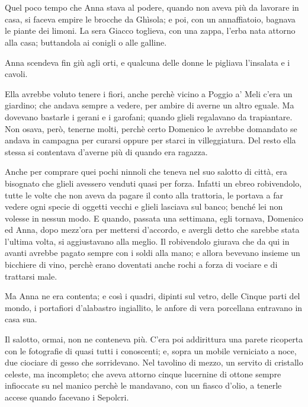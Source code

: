 \chapter{}

Quel poco tempo che Anna stava al podere, quando non aveva più da lavorare in casa, si faceva empire le brocche da Ghìsola; e poi, con un annaffiatoio, bagnava le piante dei limoni. La sera Giacco toglieva, con una zappa, l'erba nata attorno alla casa; buttandola ai conigli o alle galline.

Anna scendeva fin giù agli orti, e qualcuna delle donne le pigliava l'insalata e i cavoli.

Ella avrebbe voluto tenere i fiori, anche perchè vicino a Poggio a' Meli c'era un giardino; che andava sempre a vedere, per ambire di averne un altro eguale. Ma dovevano bastarle i gerani e i garofani; quando glieli regalavano da trapiantare. Non osava, però, tenerne molti, perchè certo Domenico le avrebbe domandato se andava in campagna per curarsi oppure per starci in villeggiatura. Del resto ella stessa si contentava d'averne più di quando era ragazza.

Anche per comprare quei pochi ninnoli che teneva nel suo salotto di città, era bisognato che glieli avessero venduti quasi per forza. Infatti un ebreo robivendolo, tutte le volte che non aveva da pagare il conto alla trattoria, le portava a far vedere ogni specie di oggetti vecchi e glieli lasciava sul banco; benché lei non volesse in nessun modo. E quando, passata una settimana, egli tornava, Domenico ed Anna, dopo mezz'ora per mettersi d'accordo, e avergli detto che sarebbe stata l'ultima volta, si aggiustavano alla meglio. Il robivendolo giurava che da qui in avanti avrebbe pagato sempre con i soldi alla mano; e allora bevevano insieme un bicchiere di vino, perchè erano doventati anche rochi a forza di vociare e di trattarsi male.

Ma Anna ne era contenta; e così i quadri, dipinti sul vetro, delle Cinque parti del mondo, i portafiori d'alabastro ingiallito, le anfore di vera porcellana entravano in casa sua.

Il salotto, ormai, non ne conteneva più. C'era poi addirittura una parete ricoperta con le fotografie di quasi tutti i conoscenti; e, sopra un mobile verniciato a noce, due ciociare di gesso che sorridevano. Nel tavolino di mezzo, un servito di cristallo celeste, ma incompleto; che aveva attorno cinque lucernine di ottone sempre infioccate su nel manico perchè le mandavano, con un fiasco d'olio, a tenerle accese quando facevano i Sepolcri.

